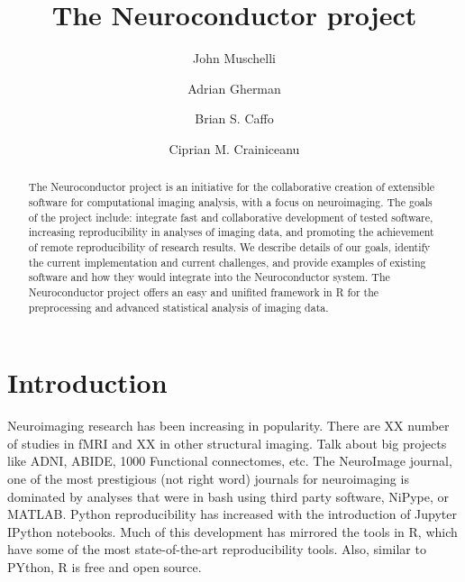 \documentclass[]{elsarticle} %
\newcommand{\fixme}[1]{{\color{red} #1}}
\newcommand{\fixme}[1]{{\color{red} #1}}
\begin{document}
\begin{frontmatter}

  \title{The Neuroconductor project}
    \author[JHU]{John Muschelli}
    \author[JHU]{Adrian Gherman}
  
    \author[JHU]{Brian S. Caffo}
  
    \author[JHU]{Ciprian M. Crainiceanu}
  
      \address[JHU]{Johns Hopkins Bloomberg School of Public Health, Department of
Biostatistics, 615 N Wolfe St, Baltimore, MD, 21205}
  
  \begin{abstract}
  The Neuroconductor project is an initiative for the collaborative
  creation of extensible software for computational imaging analysis, with
  a focus on neuroimaging. The goals of the project include: integrate
  fast and collaborative development of tested software, increasing
  reproducibility in analyses of imaging data, and promoting the
  achievement of remote reproducibility of research results. We describe
  details of our goals, identify the current implementation and current
  challenges, and provide examples of existing software and how they would
  integrate into the Neuroconductor system. \fixme{The Neuroconductor project offers an easy and unifited framework in R for the preprocessing and advanced statistical analysis of imaging data.  }
  \end{abstract}
  
 \end{frontmatter}

\section{Introduction}\label{introduction}

Neuroimaging research has been increasing in popularity. There are \fixme{XX}
number of studies in fMRI and \fixme{XX} in other structural imaging. \fixme{Talk about big projects like ADNI, ABIDE, 1000 Functional connectomes, etc}.  The
NeuroImage journal, one of the most prestigious (not right word)
journals for neuroimaging is dominated by analyses that were in bash
using third party software, NiPype, or MATLAB. Python reproducibility
has increased with the introduction of Jupyter IPython notebooks. Much
of this development has mirrored the tools in R, which have some of the
most state-of-the-art reproducibility tools. Also, similar to PYthon, R
is free and open source.
\end{document}
